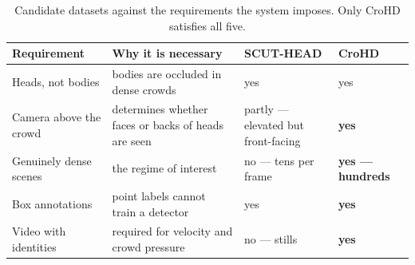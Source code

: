 %
%
%
%


\begin{table}[t]
  \centering
  \caption{Candidate datasets against the requirements the system imposes.
           Only CroHD satisfies all five.}
  \label{tab:dataset-requirements}
  \begin{tabularx}{\linewidth}{@{}L{0.80}L{1.40}L{0.95}L{0.85}@{}}
    \toprule
    \textbf{Requirement} & \textbf{Why it is necessary}
      & \textbf{SCUT-HEAD} & \textbf{CroHD} \\
    \midrule
    Heads, not bodies
      & bodies are occluded in dense crowds
      & yes & yes \\
    Camera above the crowd
      & determines whether faces or backs of heads are seen
      & partly --- elevated but front-facing
      & \textbf{yes} \\
    Genuinely dense scenes
      & the regime of interest
      & no --- tens per frame
      & \textbf{yes --- hundreds} \\
    Box annotations
      & point labels cannot train a detector
      & yes & \textbf{yes} \\
    Video with identities
      & required for velocity and crowd pressure
      & no --- stills
      & \textbf{yes} \\
    \bottomrule
  \end{tabularx}
\end{table}


